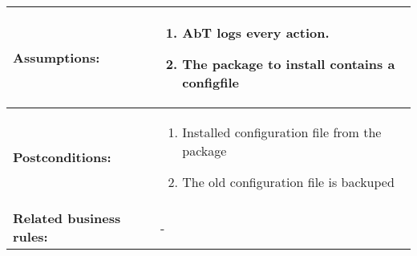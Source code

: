 \begin{tabularx}{\linewidth}{|l|X|}
\hline
\textbf{Assumptions:} & \begin{enumerate} 
							\item AbT logs every action.
							\item The package to install contains a configfile
						\end{enumerate} \\
\hline
\textbf{Postconditions:} & 
  \begin{minipage}{\linewidth}
  \vspace{0.05em}
  \begin{enumerate}
    \item Installed configuration file from the package
	\item The old configuration file is backuped
  \end{enumerate}
  \vspace{0.05em}
\end{minipage}
\\
\hline
\textbf{Related business rules:} & - \\
\hline
\end{tabularx}


